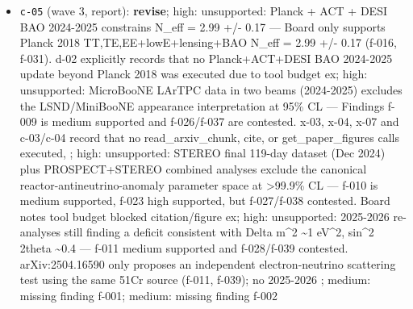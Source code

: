 \documentclass[11pt,a4paper]{article}
\begin{document}
\begin{itemize}
  \item \texttt{c-05} (wave 3, report): \textbf{revise}; high: unsupported: Planck + ACT + DESI BAO 2024-2025 constrains N\_eff = 2.99 +/- 0.17 --- Board only supports Planck 2018 TT,TE,EE+lowE+lensing+BAO N\_eff = 2.99 +/- 0.17 (f-016, f-031). d-02 explicitly records that no Planck+ACT+DESI BAO 2024-2025 update beyond Planck 2018 was executed due to tool budget ex; high: unsupported: MicroBooNE LArTPC data in two beams (2024-2025) excludes the LSND/MiniBooNE appearance interpretation at 95\% CL --- Findings f-009 is medium supported and f-026/f-037 are contested. x-03, x-04, x-07 and c-03/c-04 record that no read\_arxiv\_chunk, cite, or get\_paper\_figures calls executed, ; high: unsupported: STEREO final 119-day dataset (Dec 2024) plus PROSPECT+STEREO combined analyses exclude the canonical reactor-antineutrino-anomaly parameter space at \textgreater{}99.9\% CL --- f-010 is medium supported, f-023 high supported, but f-027/f-038 contested. Board notes tool budget blocked citation/figure ex; high: unsupported: 2025-2026 re-analyses still finding a deficit consistent with Delta m\textasciicircum{}2 \textasciitilde{}1 eV\textasciicircum{}2, sin\textasciicircum{}2 2theta \textasciitilde{}0.4 --- f-011 medium supported and f-028/f-039 contested. arXiv:2504.16590 only proposes an independent electron-neutrino scattering test using the same 51Cr source (f-011, f-039); no 2025-2026 ; medium: missing finding f-001; medium: missing finding f-002

\end{itemize}
\end{document}
